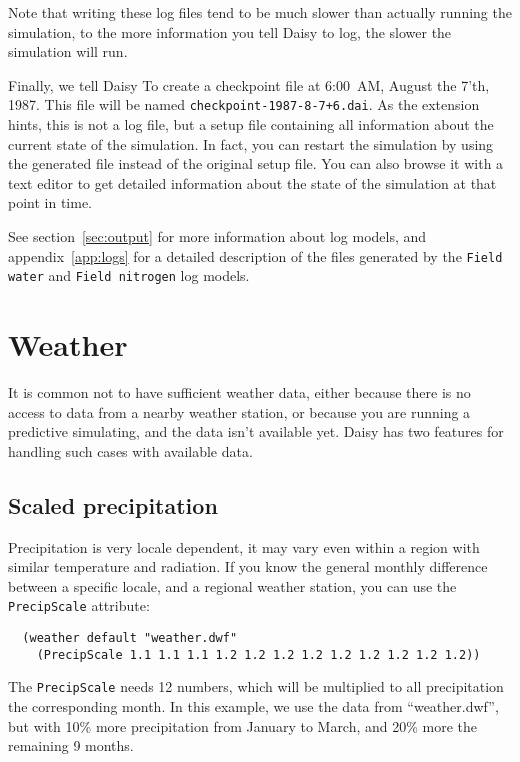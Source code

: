 \documentclass[a4paper]{article}
\begin{document}
Note that writing these log files tend to be much slower than actually
running the simulation, to the more information you tell Daisy to
log, the slower the simulation will run.

Finally, we tell Daisy To create a checkpoint file at 6:00~AM,
August the 7'th, 1987.  This file will be named
\texttt{checkpoint-1987-8-7+6.dai}.  As the extension hints, this is
not a log file, but a setup file containing all information about the
current state of the simulation.  In fact, you can restart the
simulation by using the generated file instead of the original setup
file.  You can also browse it with a text editor to get detailed
information about the state of the simulation at that point in time.

See section~\ref{sec:output} for more information about log models,
and appendix~\ref{app:logs} for a detailed description of the files
generated by the \texttt{Field water} and \texttt{Field nitrogen} log
models.

\section{Weather}
\label{sec:weather}

It is common not to have sufficient weather data, either because there
is no access to data from a nearby weather station, or because you are
running a predictive simulating, and the data isn't available yet.
Daisy has two features for handling such cases with available
data.  

\subsection{Scaled precipitation}

Precipitation is very locale dependent, it may vary even within a
region with similar temperature and radiation.  If you know the
general monthly difference between a specific locale, and a regional
weather station, you can use the \texttt{PrecipScale} attribute:
\begin{verbatim}
  (weather default "weather.dwf"
    (PrecipScale 1.1 1.1 1.1 1.2 1.2 1.2 1.2 1.2 1.2 1.2 1.2 1.2))
\end{verbatim}
The \texttt{PrecipScale} needs 12 numbers, which will be multiplied to
all precipitation the corresponding month.  In this example, we use
the data from ``weather.dwf'', but with 10\% more precipitation from
January to March, and 20\% more the remaining 9 months.
\end{document}
